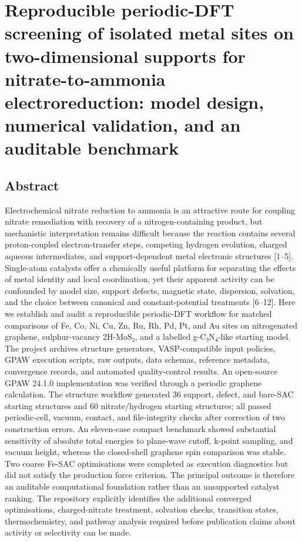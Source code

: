 \documentclass[
]{article}
\author{}
\date{}
\begin{document}
\hypertarget{reproducible-periodic-dft-screening-of-isolated-metal-sites-on-two-dimensional-supports-for-nitrate-to-ammonia-electroreduction-model-design-numerical-validation-and-an-auditable-benchmark}{%
\section{Reproducible periodic-DFT screening of isolated metal sites on
two-dimensional supports for nitrate-to-ammonia electroreduction: model
design, numerical validation, and an auditable
benchmark}\label{reproducible-periodic-dft-screening-of-isolated-metal-sites-on-two-dimensional-supports-for-nitrate-to-ammonia-electroreduction-model-design-numerical-validation-and-an-auditable-benchmark}}

\hypertarget{abstract}{%
\subsection{Abstract}\label{abstract}}

Electrochemical nitrate reduction to ammonia is an attractive route for
coupling nitrate remediation with recovery of a nitrogen-containing
product, but mechanistic interpretation remains difficult because the
reaction contains several proton-coupled electron-transfer steps,
competing hydrogen evolution, charged aqueous intermediates, and
support-dependent metal electronic structures {[}1--5{]}. Single-atom
catalysts offer a chemically useful platform for separating the effects
of metal identity and local coordination, yet their apparent activity
can be confounded by model size, support defects, magnetic state,
dispersion, solvation, and the choice between canonical and
constant-potential treatments {[}6--12{]}. Here we establish and audit a
reproducible periodic-DFT workflow for matched comparisons of Fe, Co,
Ni, Cu, Zn, Ru, Rh, Pd, Pt, and Au sites on nitrogenated graphene,
sulphur-vacancy 2H-MoS₂, and a labelled g-C₃N₄-like starting model. The
project archives structure generators, VASP-compatible input policies,
GPAW execution scripts, raw outputs, data schemas, reference metadata,
convergence records, and automated quality-control results. An
open-source GPAW 24.1.0 implementation was verified through a periodic
graphene calculation. The structure workflow generated 36 support,
defect, and bare-SAC starting structures and 60 nitrate/hydrogen
starting structures; all passed periodic-cell, vacuum, contact, and
file-integrity checks after correction of two construction errors. An
eleven-case compact benchmark showed substantial sensitivity of absolute
total energies to plane-wave cutoff, k-point sampling, and vacuum
height, whereas the closed-shell graphene spin comparison was stable.
Two coarse Fe-SAC optimisations were completed as execution diagnostics
but did not satisfy the production force criterion. The principal
outcome is therefore an auditable computational foundation rather than
an unsupported catalyst ranking. The repository explicitly identifies
the additional converged optimisations, charged-nitrate treatment,
solvation checks, transition states, thermochemistry, and pathway
analysis required before publication claims about activity or
selectivity can be made.
\end{document}
